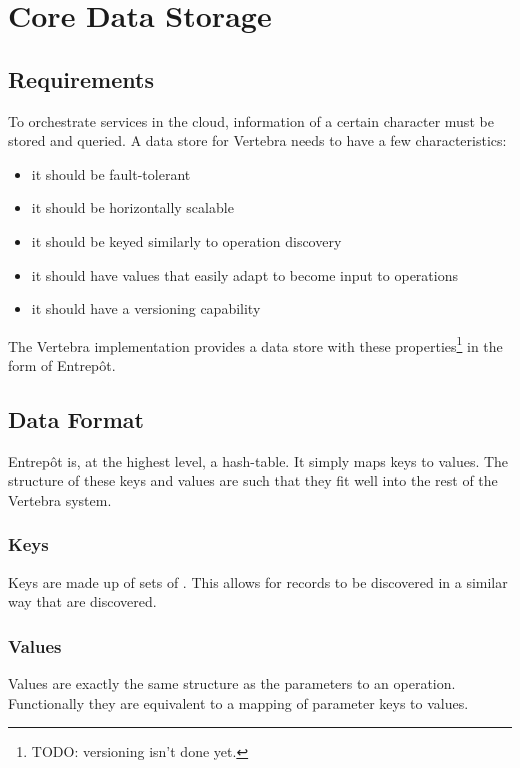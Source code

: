 \section{Core Data Storage}

\subsection{Requirements}

\label{ref:core-data-storage}To orchestrate services in the cloud, information of a certain character must be stored and queried.  A data store for Vertebra needs to have a few characteristics:

\begin{itemize}
	\item it should be fault-tolerant
	\item it should be horizontally scalable
	\item it should be keyed similarly to operation discovery
	\item it should have values that easily adapt to become input to operations
	\item it should have a versioning capability
\end{itemize}

The Vertebra implementation provides a data store with these properties\footnote{TODO: versioning isn't done yet.} in the form of Entrep\^ot.

\subsection{Data Format}

Entrep\^ot is, at the highest level, a hash-table.  It simply maps keys to values.  The structure of these keys and values are such that they fit well into the rest of the Vertebra system.

\subsubsection{Keys}

Keys are made up of sets of \resources{}.  This allows for records to be discovered in a similar way that \agents{} are discovered.

\subsubsection{Values}

Values are exactly the same structure as the parameters to an operation.  Functionally they are equivalent to a mapping of parameter keys to values.

